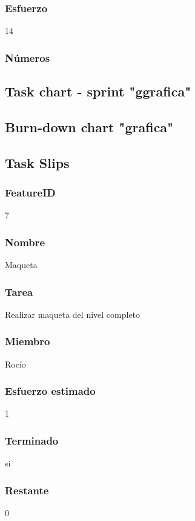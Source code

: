 \subsubsection{Esfuerzo}
14
\subsubsection{Números}



\subsection{Task chart - sprint "ggrafica"}



\subsection{Burn-down chart "grafica"}


\subsection{Task Slips}


\subsubsection{FeatureID}7
\subsubsection{Nombre}Maqueta
\subsubsection{Tarea}Realizar maqueta del nivel completo
\subsubsection{Miembro}Rocío
\subsubsection{Esfuerzo estimado}1
\subsubsection{Terminado}si
\subsubsection{Restante}0


